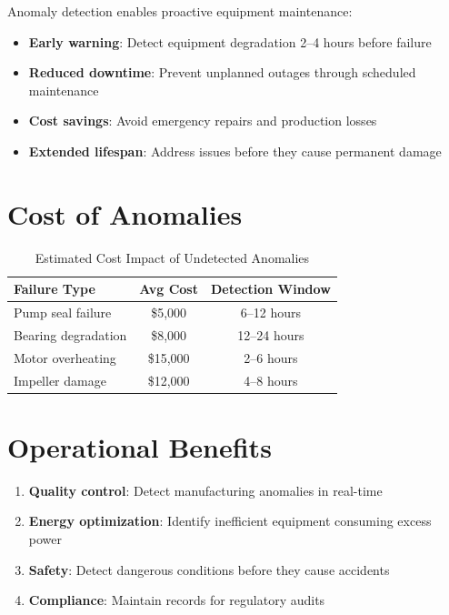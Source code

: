 \documentclass[12pt,a4paper]{report}
\begin{document}
Anomaly detection enables proactive equipment maintenance:
\begin{itemize}
    \item \textbf{Early warning}: Detect equipment degradation 2--4 hours before failure
    \item \textbf{Reduced downtime}: Prevent unplanned outages through scheduled maintenance
    \item \textbf{Cost savings}: Avoid emergency repairs and production losses
    \item \textbf{Extended lifespan}: Address issues before they cause permanent damage
\end{itemize}

\section{Cost of Anomalies}

\begin{table}[H]
\centering
\caption{Estimated Cost Impact of Undetected Anomalies}
\begin{tabular}{lcc}
\toprule
\textbf{Failure Type} & \textbf{Avg Cost} & \textbf{Detection Window} \\
\midrule
Pump seal failure & \$5,000 & 6--12 hours \\
Bearing degradation & \$8,000 & 12--24 hours \\
Motor overheating & \$15,000 & 2--6 hours \\
Impeller damage & \$12,000 & 4--8 hours \\
\bottomrule
\end{tabular}
\end{table}

\section{Operational Benefits}

\begin{enumerate}
    \item \textbf{Quality control}: Detect manufacturing anomalies in real-time
    \item \textbf{Energy optimization}: Identify inefficient equipment consuming excess power
    \item \textbf{Safety}: Detect dangerous conditions before they cause accidents
    \item \textbf{Compliance}: Maintain records for regulatory audits
\end{enumerate}
\end{document}
